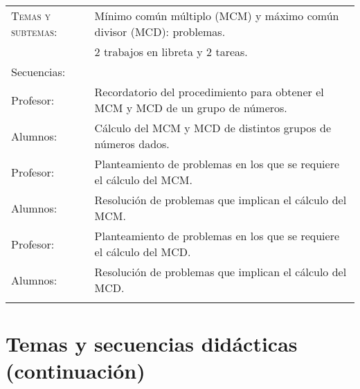 \documentclass[letterpaper,10pt]{article}
\begin{document}
\begin{tabular}[t]{R{0.25\textwidth}p{0.71\textwidth}}
    \textsc{Temas y subtemas:} & M\'inimo com\'un m\'ultiplo (MCM) y m\'aximo com\'un 
    divisor (MCD): problemas. \\
     & 2 trabajos en libreta y 2 tareas. \\
    \large{\sc Secuencias:} \\
    Profesor:    & Recordatorio del procedimiento para obtener el MCM y MCD de 
    un grupo de n\'umeros. \\
    Alumnos:     & C\'alculo del MCM y MCD de distintos grupos de n\'umeros 
    dados. \\
    Profesor:   & Planteamiento de problemas en los que se requiere el c\'alculo 
    del MCM. \\
    Alumnos:    & Resoluci\'on de problemas que implican el c\'alculo del MCM. \\
    Profesor:   & Planteamiento de problemas en los que se requiere el c\'alculo 
    del MCD. \\
    Alumnos:    & Resoluci\'on de problemas que implican el c\'alculo del MCD. 
\\ \hline \\
\end{tabular}

\newpage

\section{Temas  y secuencias did\'acticas (continuaci\'on)}
\end{document}
